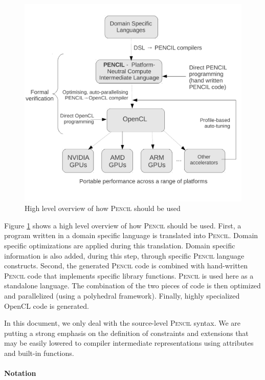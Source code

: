 \documentclass{carp}
\newcommand\pencil{\textsc{Pencil}\xspace}
\begin{document}
\begin{figure}[h]
{
 \centering
 \includegraphics[scale=0.65]{./figures/CARPHighLevelOverview.pdf}
 \caption{High level overview of how \pencil should be used}
 \label{fig-pencil-high-level-picture}
} 
\end{figure}

Figure \ref{fig-pencil-high-level-picture} shows a high level
overview of how \pencil should be used.
First, a program written in a domain
specific language is translated into \pencil.  Domain specific
optimizations are applied during this translation.  Domain specific
information is also added, during this step, through specific \pencil language
constructs.  Second, the generated \pencil code is combined with
hand-written \pencil code that implements specific library
functions.  \pencil is used here as a standalone language.  The
combination of the two pieces of code is then optimized and
parallelized (using a polyhedral framework).  Finally, highly
specialized OpenCL code is generated.

In this document, we only deal with the source-level \pencil syntax.
We are putting a strong emphasis on the definition of constraints and
extensions that may be easily
lowered to compiler intermediate representations using attributes and built-in
functions.

\paragraph*{Notation}
\end{document}
